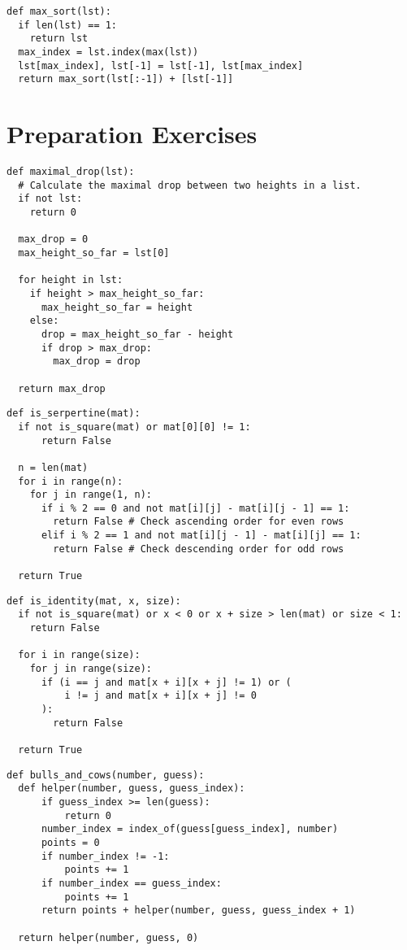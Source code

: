 \documentclass[11pt]{article}
\begin{document}
\vspace{-0.5cm}
\begin{lstlisting}
def max_sort(lst):
  if len(lst) == 1:
    return lst
  max_index = lst.index(max(lst))
  lst[max_index], lst[-1] = lst[-1], lst[max_index]
  return max_sort(lst[:-1]) + [lst[-1]]
\end{lstlisting}

\pagebreak

\section{Preparation Exercises}\label{sec:preparation-exercises}
\begin{lstlisting}
def maximal_drop(lst):
  # Calculate the maximal drop between two heights in a list.
  if not lst:
    return 0

  max_drop = 0
  max_height_so_far = lst[0]

  for height in lst:
    if height > max_height_so_far:
      max_height_so_far = height
    else:
      drop = max_height_so_far - height
      if drop > max_drop:
        max_drop = drop

  return max_drop
\end{lstlisting}

\begin{lstlisting}
def is_serpertine(mat):
  if not is_square(mat) or mat[0][0] != 1:
      return False

  n = len(mat)
  for i in range(n):
    for j in range(1, n):
      if i % 2 == 0 and not mat[i][j] - mat[i][j - 1] == 1: 
        return False # Check ascending order for even rows
      elif i % 2 == 1 and not mat[i][j - 1] - mat[i][j] == 1:  
        return False # Check descending order for odd rows

  return True
\end{lstlisting}

\begin{lstlisting}
def is_identity(mat, x, size):
  if not is_square(mat) or x < 0 or x + size > len(mat) or size < 1:
    return False

  for i in range(size):
    for j in range(size):
      if (i == j and mat[x + i][x + j] != 1) or (
          i != j and mat[x + i][x + j] != 0
      ):
        return False

  return True
\end{lstlisting}

\begin{lstlisting}
def bulls_and_cows(number, guess):
  def helper(number, guess, guess_index):
      if guess_index >= len(guess):
          return 0
      number_index = index_of(guess[guess_index], number)
      points = 0
      if number_index != -1:
          points += 1
      if number_index == guess_index:
          points += 1
      return points + helper(number, guess, guess_index + 1)

  return helper(number, guess, 0)
\end{lstlisting}
\end{document}
